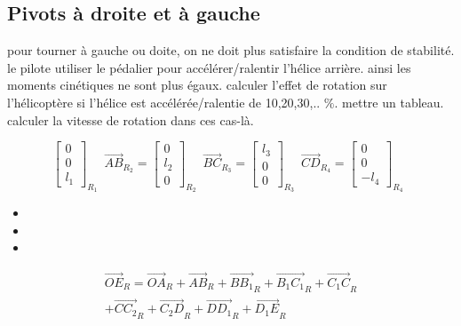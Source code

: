 \documentclass[12pt,a4paper]{article}
\begin{document}
	\subsection{Pivots à droite et à gauche}
	pour tourner à gauche ou doite, on ne doit plus satisfaire la condition de stabilité. le pilote utiliser le pédalier pour accélérer/ralentir l'hélice arrière. ainsi les moments cinétiques ne sont plus égaux.
	\medbreak
	calculer l'effet de rotation sur l'hélicoptère si l'hélice est accélérée/ralentie de 10,20,30,.. $\%$. mettre un tableau. calculer la vitesse de rotation dans ces cas-là. 
	
	
	\begin{equation}
		\begin{bmatrix}
			0 \\
			0\\
			l_1
		\end{bmatrix}_{R_{1}} \enspace
		\vec{AB}_{R_{2}}=
		\begin{bmatrix}
			0 \\
			l_2\\
			0
		\end{bmatrix}_{R_{2}} \enspace
		\vec{BC}_{R_{3}}=
		\begin{bmatrix}
			l_3 \\
			0\\
			0
		\end{bmatrix}_{R_{3}} \enspace
		\vec{CD}_{R_{4}}=
		\begin{bmatrix}
			0 \\
			0\\
			-l_4
		\end{bmatrix}_{R_{4}} \enspace
	\end{equation}
	
	\begin{itemize}
		\item
		\item 
		\item 
	\end{itemize}
	
	
	\medbreak
	
	\medbreak
	
	\medbreak
	
	\medbreak
	
	
	
	
	\begin{equation}
		\begin{split}
			\vec{OE}_R=\vec{OA}_R+\vec{AB}_R+\vec{B B_1}_R+\vec{B_1 C_1}_R+\vec{C_1 C}_R\\+\vec{C C_2}_R+\vec{C_2 D}_R+\vec{D D_1}_R+\vec{D_1 E}_R
		\end{split}
	\end{equation}
	
\end{document}
